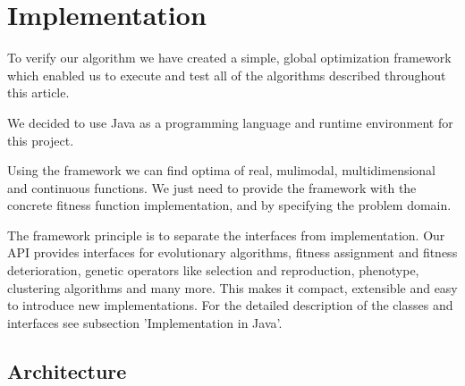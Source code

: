 

\chapter{Implementation}
\label{Implementation}
To verify our algorithm we have created a simple, global optimization framework
which enabled us to execute and test all of the algorithms described throughout
this article.

We decided to use Java \cite{java} as a programming language and runtime
environment for this project. 

Using the framework we can find optima of real, mulimodal, multidimensional and
continuous functions. We just need to provide the framework with the concrete
fitness function implementation, and by specifying the problem domain.

The framework principle is to separate the interfaces from implementation.
Our API provides interfaces for evolutionary algorithms, fitness assignment
and fitness deterioration, genetic operators like selection and reproduction,
phenotype, clustering algorithms and many more. This makes it compact,
extensible and easy to introduce new implementations.
For the detailed description of the classes and interfaces see subsection
'Implementation in Java'.  

\section{Architecture}

